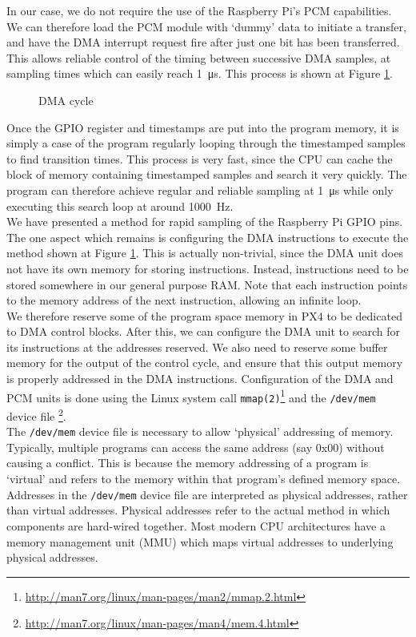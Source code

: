 \documentclass[capstone_report.tex]{subfiles}
\begin{document}
    In our case, we do not require the use of the Raspberry Pi's PCM capabilities. We can therefore load the PCM module with `dummy' data to initiate a transfer, and have the DMA interrupt request fire after just one bit has been transferred. This allows reliable control of the timing between successive DMA samples, at sampling times which can easily reach \SI{1}{\micro\second}. This process is shown at Figure \ref{fig:dma1}.


    \begin{figure}[H]
    \centering
        
        \caption{DMA cycle\label{fig:dma1}}
    \end{figure}

    Once the GPIO register and timestamps are put into the program memory, it is simply a case of the program regularly looping through the timestamped samples to find transition times. This process is very fast, since the CPU can cache the block of memory containing timestamped samples and search it very quickly. The program can therefore achieve regular and reliable sampling at \SI{1}{\micro\second} while only executing this search loop at around \SI{1000}{\hertz}.\\

    We have presented a method for rapid sampling of the Raspberry Pi GPIO pins. The one aspect which remains is configuring the DMA instructions to execute the method shown at Figure \ref{fig:dma1}. This is actually non-trivial, since the DMA unit does not have its own memory for storing instructions. Instead, instructions need to be stored somewhere in our general purpose RAM. Note that each instruction points to the memory address of the next instruction, allowing an infinite loop. \\

    We therefore reserve some of the program space memory in PX4 to be dedicated to DMA control blocks. After this, we can configure the DMA unit to search for its instructions at the addresses reserved. We also need to reserve some buffer memory for the output of the control cycle, and ensure that this output memory is properly addressed in the DMA instructions. Configuration of the DMA and PCM units is done using the Linux system call \texttt{mmap(2)}\footnote{\url{http://man7.org/linux/man-pages/man2/mmap.2.html}} and the \texttt{/dev/mem} device file \footnote{\url{http://man7.org/linux/man-pages/man4/mem.4.html}}. \\

    The \texttt{/dev/mem} device file is necessary to allow `physical' addressing of memory. Typically, multiple programs can access the same address (say 0x00) without causing a conflict. This is because the memory addressing of a program is `virtual' and refers to the memory within that program's defined memory space. Addresses in the \texttt{/dev/mem} device file are interpreted as physical addresses, rather than virtual addresses. Physical addresses refer to the actual method in which components are hard-wired together. Most modern CPU architectures have a memory management unit (MMU) which maps virtual addresses to underlying physical addresses. \\
\end{document}
